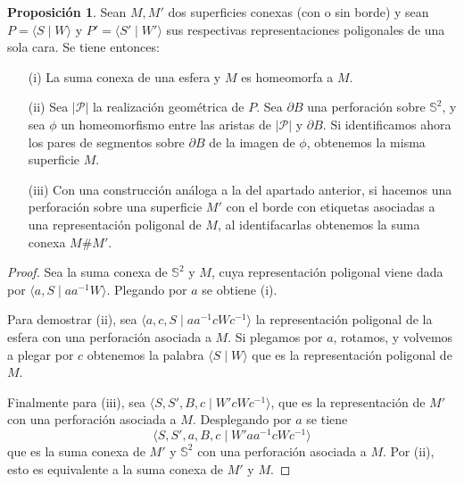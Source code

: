 \documentclass[10pt]{report}
\newcommand{\Esfera}{\mathbb{S}^2}
\theoremstyle{definition}
\newtheorem{prop}[defin]{Proposición}
\begin{document}
\begin{prop}\label{prop:suma_esfera}
Sean $M,M'$ dos superficies conexas (con o sin borde) y sean $P=\langle S\mid W\rangle$ y $P'=\langle S'\mid W'\rangle$ sus respectivas representaciones poligonales de una sola cara. Se tiene entonces:
\begin{itemize}
\item[(i)] La suma conexa de una esfera y $M$ es homeomorfa a $M$.
\item[(ii)] Sea $|\mathcal{P}|$ la realización geométrica de $P$. Sea $\partial B$ una perforación sobre $\Esfera$, y sea $\phi$ un homeomorfismo entre las aristas de $|\mathcal{P}|$ y $\partial B$. Si identificamos ahora los pares de segmentos sobre $\partial B$ de la imagen de $\phi$, obtenemos la misma superficie $M$. 
\item[(iii)] Con una construcción análoga a la del apartado anterior, si hacemos una perforación sobre una superficie $M'$ con el borde con etiquetas asociadas a una representación poligonal de $M$, al identifacarlas obtenemos la suma conexa $M\# M'$. 
\end{itemize}
\end{prop}
\begin{proof}
Sea la suma conexa de $\Esfera$ y $M$, cuya representación poligonal viene dada por $\langle a,S\mid aa^{-1}W\rangle$. Plegando por $a$ se obtiene (i).

Para demostrar (ii), sea $\langle a,c,S\mid aa^{-1}cWc^{-1}\rangle$ la representación poligonal de la esfera con una perforación asociada a $M$. Si plegamos por $a$, rotamos, y volvemos a plegar por $c$ obtenemos la palabra $\langle S\mid W\rangle$ que es la representación poligonal de $M$.

Finalmente para (iii), sea $\langle S,S',B,c\mid W'cWc^{-1}\rangle$, que es la representación de $M'$ con una perforación asociada a $M$. Desplegando por $a$ se tiene $$\langle S,S',a,B,c\mid W'aa^{-1}cWc^{-1}\rangle$$ que es la suma conexa de $M'$ y $\Esfera$ con una perforación asociada a $M$. Por (ii), esto es equivalente a la suma conexa de $M'$ y $M$. 
\end{proof}
\end{document}
